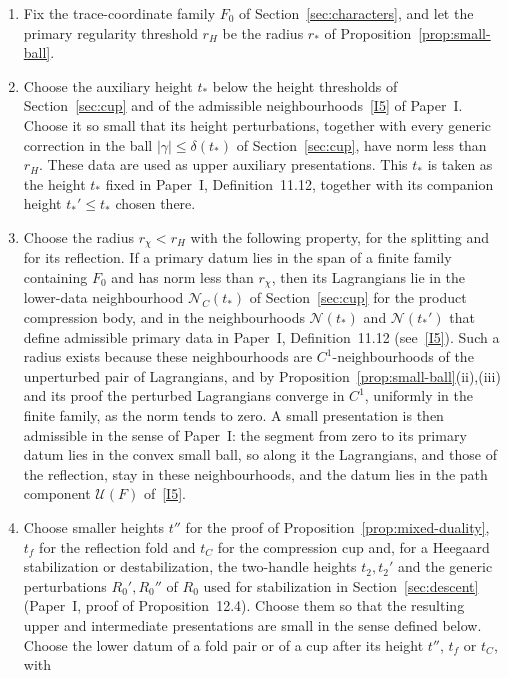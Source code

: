 \documentclass[11pt]{amsart}
\theoremstyle{definition}
\theoremstyle{remark}
\theoremstyle{plain}
\numberwithin{equation}{section}
\begin{document}
\begin{enumerate}[label=(\arabic*)]
\item Fix the trace-coordinate family $F_0$ of
Section~\ref{sec:characters}, and let the primary regularity threshold
$r_H$ be the radius $r_*$ of Proposition~\ref{prop:small-ball}.
\item Choose the auxiliary height $t_*$ below the height thresholds of
Section~\ref{sec:cup} and of the admissible neighbourhoods~\ref{I5} of
Paper~I. Choose it so small that its height perturbations, together
with every generic correction in the ball $|\gamma|\le\delta(t_*)$ of
Section~\ref{sec:cup}, have norm less than $r_H$. These data are used
as upper auxiliary presentations. This $t_*$ is taken as the height $t_*$ fixed in Paper~I,
Definition~11.12, together with its companion height $t_*'\le t_*$ chosen there.
\item Choose the radius $r_\chi<r_H$ with the following property, for
the splitting and for its reflection. If a primary datum lies in the
span of a finite family containing $F_0$ and has norm less than
$r_\chi$, then its Lagrangians lie in the lower-data neighbourhood
$\mathcal N_C(t_*)$ of Section~\ref{sec:cup} for the product
compression body, and in the neighbourhoods $\mathcal N(t_*)$ and $\mathcal N(t_*')$ that
define admissible primary data in Paper~I, Definition~11.12 (see~\ref{I5}). Such a radius
exists because these neighbourhoods are $C^1$-neighbourhoods of the
unperturbed pair of Lagrangians, and by
Proposition~\ref{prop:small-ball}(ii),(iii) and its proof the
perturbed Lagrangians converge in $C^1$, uniformly in the finite
family, as the norm tends to zero. A small presentation is then
admissible in the sense of Paper~I: the segment from zero to its
primary datum lies in the convex small ball, so along it the
Lagrangians, and those of the reflection, stay in these
neighbourhoods, and the datum lies in the path component
$\mathcal U(F)$ of~\ref{I5}.
\item Choose smaller heights $t''$ for the proof of Proposition~\ref{prop:mixed-duality},
$t_f$ for the reflection fold and $t_C$ for the compression cup and,
for a Heegaard stabilization or destabilization, the two-handle heights
$t_2,t_2'$ and the generic perturbations $R_0',R_0''$ of $R_0$ used for
stabilization in Section~\ref{sec:descent} (Paper~I, proof of
Proposition~12.4). Choose them so that the resulting upper and
intermediate presentations are small in the sense defined below.
Choose the lower datum of a fold pair or of a cup after its height $t''$, $t_f$ or $t_C$, with

\end{enumerate}
\end{document}
